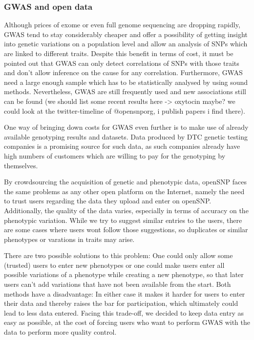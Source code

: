 \documentclass[10pt]{article}
\begin{document}
\subsubsection*{GWAS and open data}
Although prices of exome or even full genome sequencing are dropping rapidly, GWAS tend to stay considerably cheaper and offer a possibility of getting insight into genetic variations on a population level and allow an analysis of SNPs which are linked to different traits. Despite this benefit in terms of cost, it must be pointed out that GWAS can only detect correlations of SNPs with those traits and don't allow inference on the cause for any correlation. Furthermore, GWAS need a large enough sample which has to be statistically analysed by using sound methods. Nevertheless, GWAS are still frequently used and new associations still can be found (we should list some recent results here -> oxytocin maybe? we could look at the twitter-timeline of @opensnporg, i publish papers i find there).

One way of bringing down costs for GWAS even further is to make use of already available genotyping results and datasets. Data produced by DTC genetic testing companies is a promising source for such data, as such companies already have high numbers of customers which are willing to pay for the genotyping by themselves.

By crowdsourcing the acquisition of genetic and phenotypic data, openSNP faces the same problems as any other open platform on the Internet, namely the need to trust users regarding the data they upload and enter on openSNP. Additionally, the quality of the data varies, especially in terms of accuracy on the phenotypic variation. While we try to suggest similar entries to the users, there are some cases where users wont follow those suggestions, so duplicates or similar phenotypes or varations in traits may arise. 

There are two possible solutions to this problem: One could only allow some (trusted) users to enter new phenotypes or one could make users enter all possible variations of a phenotype while creating a new phenotype, so that later users can't add variations that have not been available from the start. Both methods have a disadvantage: In either case it makes it harder for users to enter their data and thereby raises the bar for participation, which ultimately could lead to less data entered. Facing this trade-off, we decided to keep data entry as easy as possible, at the cost of forcing users who want to perform GWAS with the data to perform more quality control.
\end{document}

